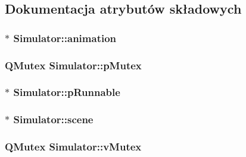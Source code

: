 \subsection{Dokumentacja atrybutów składowych}
\hypertarget{class_simulator_afa279a763fb0f744606c7d343ee9843d}{
\subsubsection[{animation}]{$\ast$ Simulator\-::animation}}\label{class_simulator_afa279a763fb0f744606c7d343ee9843d}
\hypertarget{class_simulator_a9b12b4ecb21b9fa0a6e8b43de0683b6c}{
\subsubsection[{p\-Mutex}]{\setlength{\rightskip}{0pt plus 5cm}Q\-Mutex Simulator\-::p\-Mutex\hspace{0.3cm}{\ttfamily [private]}}}\label{class_simulator_a9b12b4ecb21b9fa0a6e8b43de0683b6c}
\hypertarget{class_simulator_a81dbad2542cad2e24995c90e01df4563}{
\subsubsection[{p\-Runnable}]{$\ast$ Simulator\-::p\-Runnable\hspace{0.3cm}{\ttfamily [private]}}}\label{class_simulator_a81dbad2542cad2e24995c90e01df4563}
\hypertarget{class_simulator_abdd826ea1db1c69cc087d24fe69ca272}{
\subsubsection[{scene}]{$\ast$ Simulator\-::scene\hspace{0.3cm}{\ttfamily [private]}}}\label{class_simulator_abdd826ea1db1c69cc087d24fe69ca272}
\hypertarget{class_simulator_adc7182b7aa6d573820b41cebab938518}{
\subsubsection[{v\-Mutex}]{\setlength{\rightskip}{0pt plus 5cm}Q\-Mutex Simulator\-::v\-Mutex\hspace{0.3cm}{\ttfamily [private]}}}\label{class_simulator_adc7182b7aa6d573820b41cebab938518}
